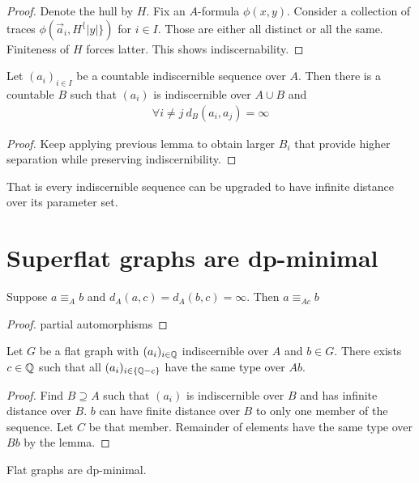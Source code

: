 \documentclass{amsart}
\begin{document}
\begin{proof}
	Denote the hull by $H$. Fix an $A$-formula $\phi(x,y)$. Consider a collection of traces $\phi(\vec a_i, H^\{|y|\})$ for $i \in I$. Those are either all distinct or all the same. Finiteness of $H$ forces latter. This shows indiscernability.
\end{proof}

\begin{Corollary}
	Let $(a_i)_{i \in I}$ be a countable indiscernible sequence over $A$. Then there is a countable $B$ such that  $(a_i)$ is indiscernible over $A \cup B$ and
	\begin{align*}
		\forall i \neq j \ d_B(a_i, a_j) = \infty
	\end{align*}
\end{Corollary}

\begin{proof}
	Keep applying previous lemma to obtain larger $B_i$ that provide higher separation while preserving indiscernibility.
\end{proof}

That is every indiscernible sequence can be upgraded to have infinite distance over its parameter set.

\section{Superflat graphs are dp-minimal}

\begin{Lemma}
	Suppose $a \equiv_A b$ and $d_A(a, c) = d_A(b, c) = \infty$. Then $a \equiv_{Ac} b$
\end{Lemma}

\begin{proof}
	partial automorphisms
\end{proof}

\begin{Theorem}
	Let $G$ be a flat graph with $(a_i)_{i\in\mathbb{Q}}$ indiscernible over $A$ and $b \in G$. There exists $c \in \mathbb{Q}$ such that all $(a_i)_{i\in\{\mathbb{Q} - c\}}$ have the same type over $Ab$.
\end{Theorem}

\begin{proof}
	Find $B \supseteq A$ such that $(a_i)$ is indiscernible over $B$ and has infinite distance over $B$. $b$ can have finite distance over $B$ to only one member of the sequence. Let $C$ be that member. Remainder of elements have the same type over $Bb$ by the lemma.
\end{proof}

\begin{Corollary}
	Flat graphs are dp-minimal.
\end{Corollary}
\end{document}
